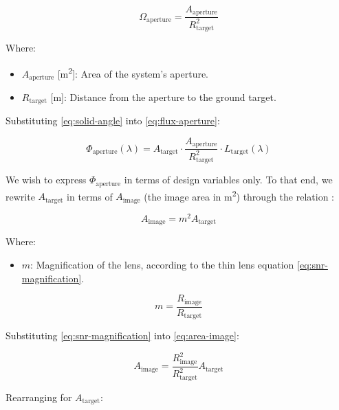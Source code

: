 \documentclass{article}
\begin{document}
\begin{equation} \label{eq:solid-angle}
    \Omega_{\text{aperture}} = \frac{A_{\text{aperture}}}{R_{\text{target}}^2}  %
\end{equation}

Where:
\begin{itemize}[label={}]
    \item $A_{\text{aperture}}$ [\si{\meter\squared}]: Area of the system's aperture.
    \item $R_{\text{target}}$ [\si{\meter}]: Distance from the aperture to the ground target.
\end{itemize}

 Substituting \eqref{eq:solid-angle} into \eqref{eq:flux-aperture}:

\begin{equation} \label{eq:flux-aperture-2}
    \Phi_{\text{aperture}}(\lambda) = A_{\text{target}} \cdot \frac{A_{\text{aperture}}}{R_{\text{target}}^2} \cdot L_{\text{target}}(\lambda)
\end{equation}

We wish to express $\Phi_{\text{aperture}}$ in terms of design variables only. To that end, we rewrite $A_{\text{target}}$ in terms of $A_{\text{image}}$ (the image area in \si{\meter\squared}) through the relation \cite{Fiete2001-kz}:

\begin{equation} \label{eq:area-image}
    A_{\text{image}} = m^2 A_{\text{target}}
\end{equation}

Where:
\begin{itemize}[label={}]
    \item $m$: Magnification of the lens, according to the thin lens equation \eqref{eq:snr-magnification}. \cite{Fiete2001-kz}
\end{itemize}

\begin{equation} \label{eq:snr-magnification}
    m = \frac{R_{\text{image}}}{R_{\text{target}}}
\end{equation}

Substituting \eqref{eq:snr-magnification} into \eqref{eq:area-image}:

\begin{equation}
    A_{\text{image}} = \frac{R_{\text{image}}^2}{R_{\text{target}}^2} A_{\text{target}}
\end{equation}

Rearranging for $A_{\text{target}}$:
\end{document}

